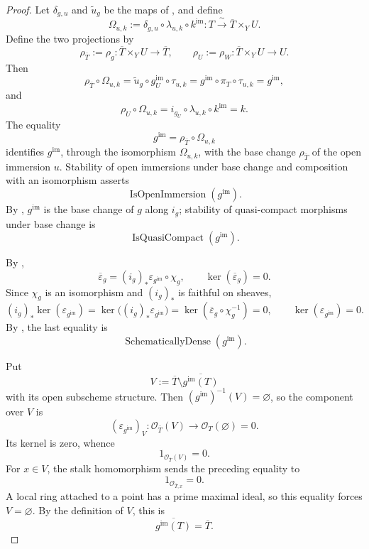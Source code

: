 \begin{proof}
  Let $\delta_{g,u}$ and $\widetilde u_g$ be the maps of
  , and define
  \[
    \Omega_{u,k}:=
      \delta_{g,u}\circ\lambda_{u,k}\circ k^{\mathrm{im}}
      \colon T\xrightarrow{\ \sim\ }\overline T\times_YU.
  \]
  Define the two projections by
  \[
    \rho_{\overline T}:=\rho_g\colon
      \overline T\times_YU\to\overline T,
    \qquad
    \rho_U:=\rho_W\colon\overline T\times_YU\to U.
  \]
  Then
  \[
    \rho_{\overline T}\circ\Omega_{u,k}
      =\widetilde u_g\circ g_U^{\mathrm{im}}\circ\tau_{u,k}
      =g^{\mathrm{im}}\circ\pi_T\circ\tau_{u,k}
      =g^{\mathrm{im}},
  \]
  and
  \[
    \rho_U\circ\Omega_{u,k}
      =i_{g_U}\circ\lambda_{u,k}\circ k^{\mathrm{im}}
      =k.
  \]
  The equality
  \[
    g^{\mathrm{im}}=\rho_{\overline T}\circ\Omega_{u,k}
  \]
  identifies $g^{\mathrm{im}}$, through the isomorphism $\Omega_{u,k}$,
  with the base change $\rho_{\overline T}$ of the open immersion $u$.
  Stability of open immersions under base change and composition with an
  isomorphism asserts
  \[
    \operatorname{IsOpenImmersion}(g^{\mathrm{im}}).
  \]
  By ,
  $g^{\mathrm{im}}$ is the base change of $g$ along $i_g$; stability of
  quasi-compact morphisms under base change is
  \[
    \operatorname{IsQuasiCompact}(g^{\mathrm{im}}).
  \]

  By ,
  \[
    \overline\varepsilon_g
      =(i_g)_*\varepsilon_{g^{\mathrm{im}}}\circ\chi_g,
    \qquad
    \ker(\overline\varepsilon_g)=0.
  \]
  Since $\chi_g$ is an isomorphism and $(i_g)_*$ is faithful on sheaves,
  \[
    (i_g)_*\ker(\varepsilon_{g^{\mathrm{im}}})
      =\ker\bigl((i_g)_*\varepsilon_{g^{\mathrm{im}}}\bigr)
      =\ker(\overline\varepsilon_g\circ\chi_g^{-1})
      =0,
    \qquad
    \ker(\varepsilon_{g^{\mathrm{im}}})=0.
  \]
  By , the last equality is
  \[
    \operatorname{SchematicallyDense}(g^{\mathrm{im}}).
  \]

  Put
  \[
    V:=\overline T\setminus
      \overline{g^{\mathrm{im}}(T)}
  \]
  with its open subscheme structure.  Then
  $(g^{\mathrm{im}})^{-1}(V)=\varnothing$, so the component over $V$ is
  \[
    (\varepsilon_{g^{\mathrm{im}}})_V\colon
      \mathcal O_{\overline T}(V)\longrightarrow
      \mathcal O_T(\varnothing)=0.
  \]
  Its kernel is zero, whence
  \[
    1_{\mathcal O_{\overline T}(V)}=0.
  \]
  For $x\in V$, the stalk homomorphism sends the preceding equality to
  \[
    1_{\mathcal O_{\overline T,x}}=0.
  \]
  A local ring attached to a point has a prime maximal ideal, so this
  equality forces $V=\varnothing$.  By the definition of $V$, this is
  \[
    \overline{g^{\mathrm{im}}(T)}=\overline T.
  \]
\end{proof}

